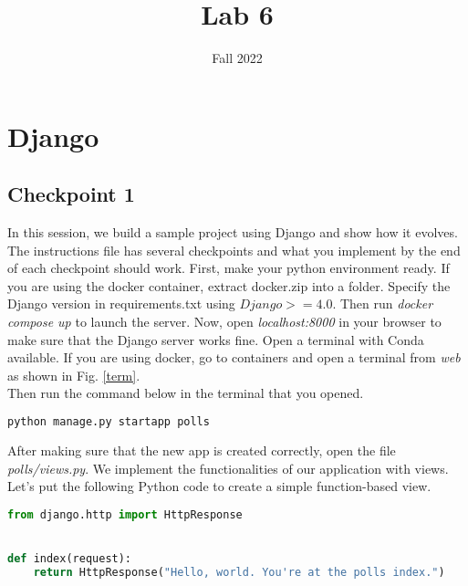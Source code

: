 \documentclass{homework}
\author{}
\date{Fall 2022}
\title{Lab 6}
\begin{document}
 \maketitle

\section*{Django}
\subsection*{Checkpoint 1}
In this session, we build a sample project using Django and show how it evolves. The instructions file has several checkpoints and what you implement by the end of each checkpoint should work. First, make your python environment ready. If you are using the docker container, extract docker.zip into a folder. Specify the Django version in requirements.txt using \textbf{$Django>=4.0$}. Then run \textit{docker compose up} to launch the server. Now, open \textit{localhost:8000} in your browser to make sure that the Django server works fine. Open a terminal with Conda available. If you are using docker, go to containers and open a terminal from \textit{web} as shown in Fig. \ref{term}.
\\
Then run the command below in the terminal that you opened.

\begin{lstlisting}[language=bash]
python manage.py startapp polls
\end{lstlisting}

After making sure that the new app is created correctly, open the file \textit{polls/views.py}. We implement the functionalities of our application with views. Let's put the following Python code to create a simple function-based view.
\begin{lstlisting}[language=Python]
from django.http import HttpResponse


def index(request):
    return HttpResponse("Hello, world. You're at the polls index.")
\end{lstlisting}
 
\end{document}
